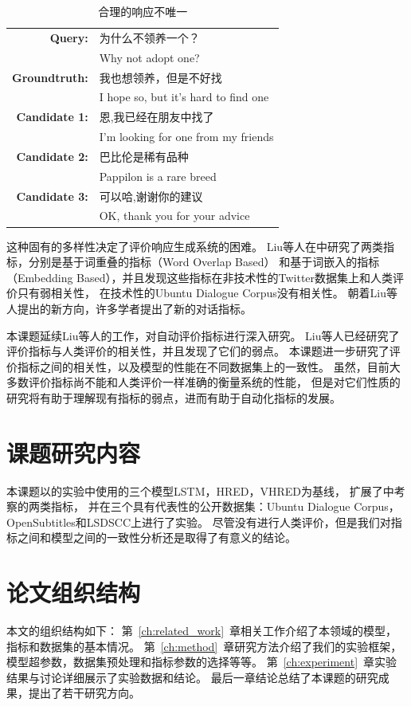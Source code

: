 \begin{table}[H]
    \centering
    \caption{合理的响应不唯一}
    \label{tab:multiple_valid_responses}
    \begin{tabular}{rl}
        \toprule
        \textbf{Query:} & 为什么不领养一个？ \\
        & Why not adopt one? \\
        \textbf{Groundtruth:} & 我也想领养，但是不好找 \\
        & I hope so, but it's hard to find one \\
        \midrule
        \textbf{Candidate 1:} & 恩,我已经在朋友中找了 \\
        & I'm looking for one from my friends \\
        \textbf{Candidate 2:} & 巴比伦是稀有品种 \\
        & Pappilon is a rare breed \\
        \textbf{Candidate 3:} & 可以哈,谢谢你的建议 \\
        & OK, thank you for your advice \\
        \bottomrule
    \end{tabular}
\end{table}

这种固有的多样性决定了评价响应生成系统的困难。
Liu等人在\cite{HowNot}中研究了两类指标，分别是基于词重叠的指标（Word Overlap Based）
和基于词嵌入的指标（Embedding Based），并且发现这些指标在非技术性的Twitter数据集上和人类评价只有弱相关性，
在技术性的Ubuntu Dialogue Corpus没有相关性。
朝着Liu等人提出的新方向，许多学者提出了新的对话指标。

本课题延续Liu等人的工作，对自动评价指标进行深入研究。
Liu等人已经研究了评价指标与人类评价的相关性，并且发现了它们的弱点。
本课题进一步研究了评价指标之间的相关性，以及模型的性能在不同数据集上的一致性。
虽然，目前大多数评价指标尚不能和人类评价一样准确的衡量系统的性能，
但是对它们性质的研究将有助于理解现有指标的弱点，进而有助于自动化指标的发展。

\section{课题研究内容}\label{sec:reseach_content}
本课题以\cite{VHRED}的实验中使用的三个模型LSTM，HRED，VHRED为基线，
扩展了\cite{HowNot}中考察的两类指标，
并在三个具有代表性的公开数据集：Ubuntu Dialogue Corpus，OpenSubtitles和LSDSCC上进行了实验。
尽管没有进行人类评价，但是我们对指标之间和模型之间的一致性分析还是取得了有意义的结论。

\section{论文组织结构}\label{sec:paper_organization}
本文的组织结构如下：
第~\ref{ch:related_work}~章相关工作介绍了本领域的模型，指标和数据集的基本情况。
第~\ref{ch:method}~章研究方法介绍了我们的实验框架，模型超参数，数据集预处理和指标参数的选择等等。
第~\ref{ch:experiment}~章实验结果与讨论详细展示了实验数据和结论。
最后一章结论总结了本课题的研究成果，提出了若干研究方向。
